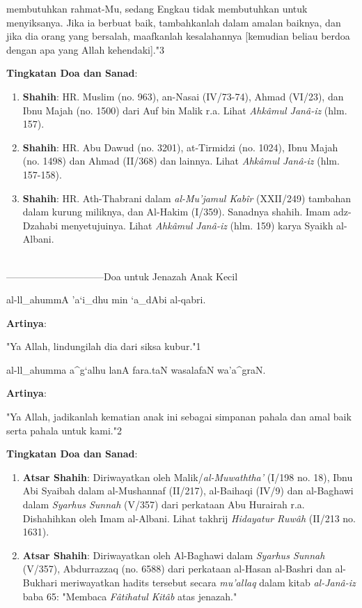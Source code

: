 \documentclass[a4paper,12pt]{article}
\begin{document}
membutuhkan rahmat-Mu, sedang Engkau tidak membutuhkan untuk menyiksanya. 
Jika ia berbuat baik, tambahkanlah dalam amalan baiknya, dan jika dia orang
yang bersalah, maafkanlah kesalahannya [kemudian beliau berdoa dengan apa 
yang Allah kehendaki]."{\scriptsize 3}\\
\par
\noindent
\textbf{Tingkatan Doa dan Sanad}:
\begin{enumerate}
\item \textbf{Shahih}: HR. Muslim (no. 963), an-Nasai (IV/73-74), Ahmad 
(VI/23), dan Ibnu Majah (no. 1500) dari Auf bin Malik r.a. Lihat 
\textit{Ahk\^{a}mul Jan\^{a}-iz} (hlm. 157).
\item \textbf{Shahih}: HR. Abu Dawud (no. 3201), at-Tirmidzi (no. 1024), 
Ibnu Majah (no. 1498) dan Ahmad (II/368) dan lainnya. Lihat 
\textit{Ahk\^{a}mul Jan\^{a}-iz} (hlm. 157-158).
\item \textbf{Shahih}: HR. Ath-Thabrani dalam \textit{al-Mu'jamul 
Kab\^{i}r} (XXII/249) tambahan dalam kurung miliknya, dan Al-Hakim (I/359).
Sanadnya shahih. Imam adz-Dzahabi menyetujuinya. Lihat \textit{Ahk\^{a}mul 
Jan\^{a}-iz} (hlm. 159) karya Syaikh al-Albani.\\\\
\end{enumerate}
\par
{}------------------------------Doa untuk Jenazah Anak Kecil
\begin{arabtext}
\noindent
al-ll_ahummA 'a`i_dhu min `a_dAbi al-qabri.\\
\end{arabtext}
\noindent
\textbf{Artinya}:
\par
\indent
"Ya Allah, lindungilah dia dari siksa kubur."{\scriptsize 1}\\
\begin{arabtext}
\noindent
al-ll_ahumma a^g`alhu lanA fara.taN wasalafaN wa'a^graN.\\
\end{arabtext}
\noindent
\textbf{Artinya}:
\par
\indent
"Ya Allah, jadikanlah kematian anak ini sebagai simpanan pahala dan amal 
baik serta pahala untuk kami."{\scriptsize 2}\\
\par
\noindent
\textbf{Tingkatan Doa dan Sanad}:
\begin{enumerate}
\item \textbf{Atsar Shahih}: Diriwayatkan oleh Malik/\textit{al-Muwaththa'}
(I/198 no. 18), Ibnu Abi Syaibah dalam al-Mushannaf (II/217), al-Baihaqi 
(IV/9) dan al-Baghawi dalam \textit{Syarhus Sunnah} (V/357) dari perkataan 
Abu Hurairah r.a. Dishahihkan oleh Imam al-Albani. Lihat takhrij 
\textit{Hidayatur Ruw\^{a}h} (II/213 no. 1631).
\item \textbf{Atsar Shahih}: Diriwayatkan oleh Al-Baghawi dalam 
\textit{Syarhus Sunnah} (V/357), Abdurrazzaq (no. 6588) dari perkataan 
al-Hasan al-Bashri dan al-Bukhari meriwayatkan hadits tersebut secara 
\textit{mu'allaq} dalam kitab \textit{al-Jan\^{a}-iz} baba 65: "Membaca 
\textit{F\^{a}tihatul Kit\^{a}b} atas jenazah."\\\\
\end{enumerate}
\end{document}

